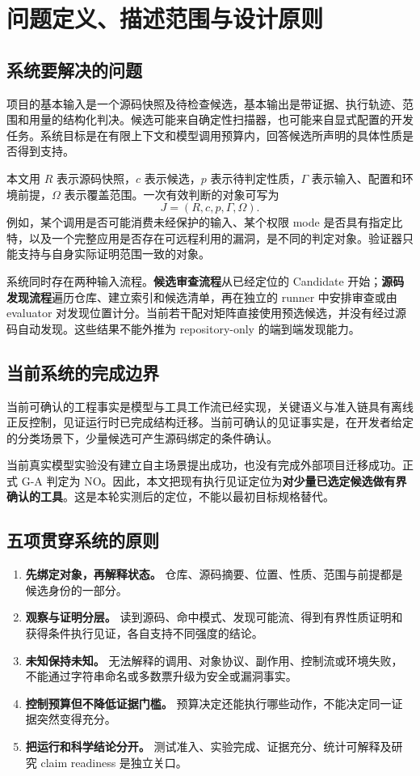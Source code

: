 \documentclass[UTF8,a4paper,zihao=-4,fontset=none]{ctexart}
\begin{document}
\section{问题定义、描述范围与设计原则}
\subsection{系统要解决的问题}
项目的基本输入是一个源码快照及待检查候选，基本输出是带证据、执行轨迹、范围和用量的结构化判决。候选可能来自确定性扫描器，也可能来自显式配置的开发任务。系统目标是在有限上下文和模型调用预算内，回答候选所声明的具体性质是否得到支持。

本文用 $R$ 表示源码快照，$c$ 表示候选，$p$ 表示待判定性质，$\Gamma$ 表示输入、配置和环境前提，$\Omega$ 表示覆盖范围。一次有效判断的对象可写为
\begin{equation}
  J=(R,c,p,\Gamma,\Omega).
\end{equation}
例如，某个调用是否可能消费未经保护的输入、某个权限 mode 是否具有指定比特，以及一个完整应用是否存在可远程利用的漏洞，是不同的判定对象。验证器只能支持与自身实际证明范围一致的对象。

系统同时存在两种输入流程。\textbf{候选审查流程}从已经定位的 Candidate 开始；\textbf{源码发现流程}遍历仓库、建立索引和候选清单，再在独立的 runner 中安排审查或由 evaluator 对发现位置计分。当前若干配对矩阵直接使用预选候选，并没有经过源码自动发现。这些结果不能外推为 repository-only 的端到端发现能力。

\subsection{当前系统的完成边界}
当前可确认的工程事实是模型与工具工作流已经实现，关键语义与准入链具有离线正反控制，见证运行时已完成结构迁移。当前可确认的见证事实是，在开发者给定的分类场景下，少量候选可产生源码绑定的条件确认。

当前真实模型实验没有建立自主场景提出成功，也没有完成外部项目迁移成功。正式 G-A 判定为 NO。因此，本文把现有执行见证定位为\textbf{对少量已选定候选做有界确认的工具}。这是本轮实测后的定位，不能以最初目标规格替代。\cite{status,positioning,gate}

\subsection{五项贯穿系统的原则}
\begin{enumerate}
\item \textbf{先绑定对象，再解释状态。} 仓库、源码摘要、位置、性质、范围与前提都是候选身份的一部分。
\item \textbf{观察与证明分层。} 读到源码、命中模式、发现可能流、得到有界性质证明和获得条件执行见证，各自支持不同强度的结论。
\item \textbf{未知保持未知。} 无法解释的调用、对象协议、副作用、控制流或环境失败，不能通过字符串命名或多数票升级为安全或漏洞事实。
\item \textbf{控制预算但不降低证据门槛。} 预算决定还能执行哪些动作，不能决定同一证据突然变得充分。
\item \textbf{把运行和科学结论分开。} 测试准入、实验完成、证据充分、统计可解释及研究 claim readiness 是独立关口。
\end{enumerate}
\end{document}
